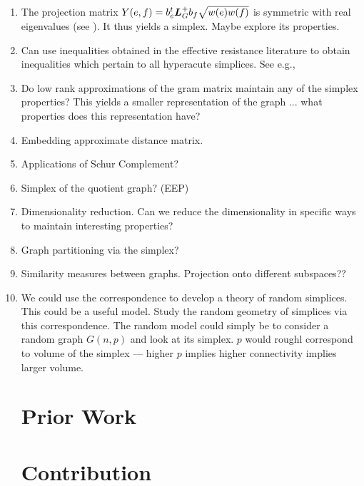 \begin{enumerate}
	\item The projection matrix $Y(e,f)=b_e^t \vb*{L}_G^+b_f\sqrt{w(e)w(f)}$ is symmetric with real eigenvalues (see \cite{vishnoi2013lx}). It thus yields a simplex. Maybe explore its properties. 
	\item Can use inequalities obtained in the effective resistance literature to obtain inequalities which pertain to all hyperacute simplices. See e.g.,\cite{alev2017graph} 
\item Do low rank approximations of the gram matrix maintain any of the simplex properties? This yields a smaller representation of the graph ... what properties does this representation have?
\item Embedding approximate distance matrix. 
\item Applications of Schur Complement? 
    \item Simplex of the quotient graph? (EEP)

    \item Dimensionality reduction. Can we reduce the dimensionality in specific ways to maintain interesting properties? 
    \item Graph partitioning via the simplex? 
    \item Similarity measures between graphs. Projection onto different subspaces??
         
    \item We could use the correspondence to develop a theory of random simplices. This could be a useful model. Study the random geometry of simplices via this correspondence. The random model could simply be to consider a random graph $G(n,p)$ and look at its simplex. $p$ would roughl correspond to volume of the simplex --- higher $p$ implies higher connectivity implies larger volume. 
    
    \section{Prior Work}
    
    \section{Contribution}
   
\end{enumerate}
